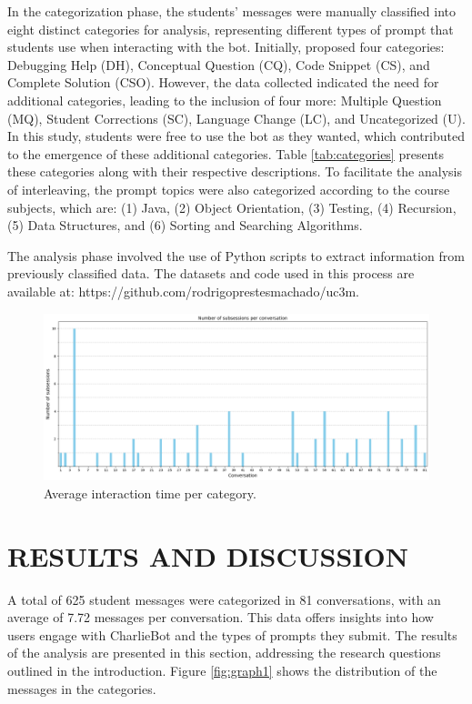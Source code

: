 \documentclass[a4paper,twoside]{article}
\begin{document}
In the categorization phase, the students' messages were manually classified
into eight distinct categories for analysis, representing different types of
prompt that students use when interacting with the bot. Initially,
\cite{Ghimire24} proposed four categories: Debugging Help (DH), Conceptual
Question (CQ), Code Snippet (CS), and Complete Solution (CSO). However, the data
collected indicated the need for additional categories, leading to the inclusion
of four more: Multiple Question (MQ), Student Corrections (SC), Language Change
(LC), and Uncategorized (U). In this study, students were free to use the bot as
they wanted, which contributed to the emergence of these additional categories.
Table \ref{tab:categories} presents these categories along with their respective
descriptions. To facilitate the analysis of interleaving, the prompt topics were
also categorized according to the course subjects, which are: (1) Java, (2)
Object Orientation, (3) Testing, (4) Recursion, (5) Data Structures, and (6)
Sorting and Searching Algorithms.

The analysis phase involved the use of Python scripts to extract information
from previously classified data. The datasets and code used in this process are
available at: https://github.com/rodrigoprestesmachado/uc3m.

\begin{figure}[htbp]
  \centering
  \includegraphics[scale=0.39]{img/figure3.png}
  \caption{Average interaction time per category.}
  \label{fig:graph3}
\end{figure}

\section{\uppercase{Results and Discussion}}

A total of 625 student messages were categorized in 81 conversations, with
an average of 7.72 messages per conversation. This data offers insights into how
users engage with CharlieBot and the types of prompts they submit. The results
of the analysis are presented in this section, addressing the research questions
outlined in the introduction. Figure \ref{fig:graph1} shows the distribution of
the messages in the categories.
\end{document}
